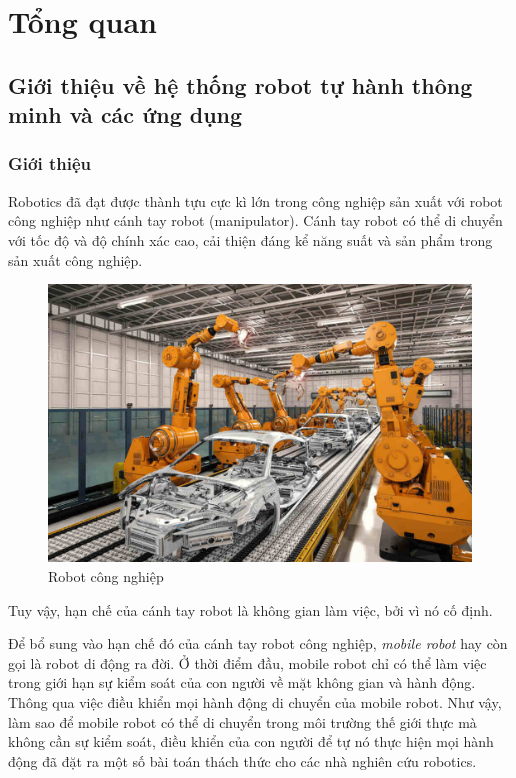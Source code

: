 \chapter{Tổng quan}

\section{Giới thiệu về hệ thống robot tự hành thông minh và các ứng dụng}
\subsection{Giới thiệu}

Robotics đã đạt được thành tựu cực kì lớn trong công nghiệp sản xuất với robot công nghiệp như cánh tay robot (manipulator). Cánh tay robot có thể di chuyển với tốc độ và độ chính xác cao, cải thiện đáng kể năng suất và sản phẩm trong sản xuất công nghiệp.
\cite{siegwart2011introduction}

\begin{figure}[h]
    \centering
    \includegraphics[width=13cm]{chapter1/figs/IndustrialRobot.jpg}
    \caption{Robot công nghiệp}
\end{figure}

Tuy vậy, hạn chế của cánh tay robot là không gian làm việc, bởi vì nó cố định.

Để bổ sung vào hạn chế đó của cánh tay robot công nghiệp, \textit{mobile robot} hay còn gọi là robot di động ra đời. 
Ở thời điểm đầu, mobile robot chỉ có thể làm việc trong giới hạn sự kiểm soát của con người về mặt không gian và hành động. Thông qua việc điều khiển mọi hành động di chuyển của mobile robot. 
Như vậy, làm sao để mobile robot có thể di chuyển trong môi trường thế giới thực mà không cần sự kiểm soát, điều khiển của con người để tự nó thực hiện mọi hành động đã đặt ra một số bài toán thách thức cho các nhà nghiên cứu robotics.





